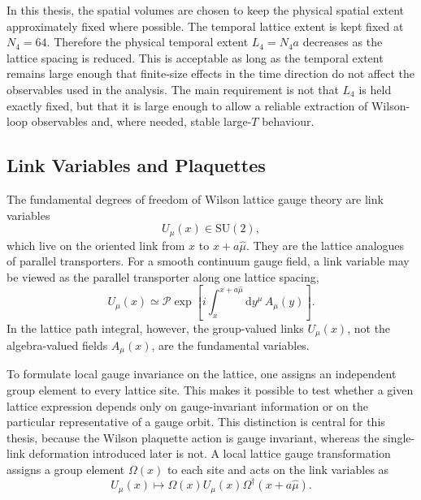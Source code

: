 \documentclass[12pt,a4paper,oneside,numbers=noenddot]{scrreprt}
\newcommand{\SU}{\mathrm{SU}}
\newcommand{\dd}{\mathrm{d}}
\newcommand{\latspacing}{a}
\begin{document}
In this thesis, the spatial volumes are chosen to keep the physical spatial
extent approximately fixed where possible. The temporal lattice extent is kept
fixed at \(N_4=64\). Therefore the physical temporal extent \(L_4=N_4\latspacing\)
decreases as the lattice spacing is reduced. This is acceptable as long as the
temporal extent remains large enough that finite-size effects in the time
direction do not affect the observables used in the analysis. The main
requirement is not that \(L_4\) is held exactly fixed, but that it is large
enough to allow a reliable extraction of Wilson-loop observables and, where
needed, stable large-\(T\) behaviour.

\subsection{Link Variables and Plaquettes}
\label{subsec:link-variables-plaquettes}

The fundamental degrees of freedom of Wilson lattice gauge theory are link
variables
\begin{equation}
  U_\mu(x) \in \SU(2),
\end{equation}
which live on the oriented link from \(x\) to
\(x+\latspacing\hat\mu\). They are the lattice analogues of parallel
transporters. For a smooth continuum gauge field, a link variable may be
viewed as the parallel transporter along one lattice spacing,
\begin{equation}
  U_\mu(x)
  \simeq
  \mathcal{P}
  \exp\left[
    i\int_x^{x+\latspacing\hat\mu}
    \dd y^\mu\, A_\mu(y)
  \right].
\end{equation}
In the lattice path integral, however, the group-valued links \(U_\mu(x)\),
not the algebra-valued fields \(A_\mu(x)\), are the fundamental variables.

To formulate local gauge invariance on the lattice, one assigns an independent
group element to every lattice site. This makes it possible to test whether a
given lattice expression depends only on gauge-invariant information or on the
particular representative of a gauge orbit. This distinction is central for this
thesis, because the Wilson plaquette action is gauge invariant, whereas the
single-link deformation introduced later is not. A local lattice gauge
transformation assigns a group element \(\Omega(x)\) to each site and acts on
the link variables as
\begin{equation}
  U_\mu(x)
  \mapsto
  \Omega(x) U_\mu(x) \Omega^\dagger(x+\latspacing\hat\mu).
  \label{eq:lattice-gauge-transformation}
\end{equation}
\end{document}
